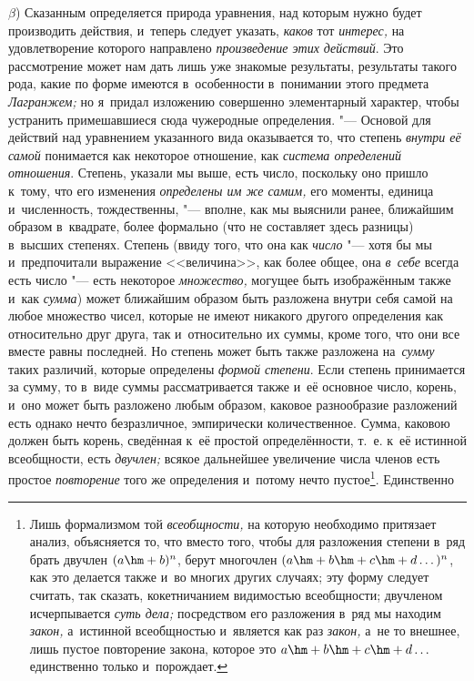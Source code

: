 $\beta$) Сказанным определяется природа уравнения, над которым нужно будет
производить действия, и~теперь следует указать, {\em каков} тот {\em интерес,}
на удовлетворение которого направлено {\em произведение этих действий}. Это
рассмотрение может нам дать лишь уже знакомые результаты, результаты такого
рода, какие по форме имеются в~особенности в~понимании этого предмета
{\em Лагранжем;} но я~придал изложению совершенно элементарный характер, чтобы
устранить примешавшиеся сюда чужеродные определения. "--- Основой для действий
над уравнением указанного вида оказывается то, что степень
{\em внутри её самой} понимается как некоторое отношение, как
{\em система определений отношения}. Степень, указали мы выше, есть число,
поскольку оно пришло к~тому, что его изменения {\em определены им же самим,}
его моменты, единица и~численность, тождественны, "--- вполне, как мы выяснили
ранее, ближайшим образом в~квадрате, более формально (что не составляет здесь
разницы) в~высших степенях. Степень (ввиду того, что она как {\em число} "---
хотя бы мы и~предпочитали выражение <<величина>>, как более общее, она
{\em в~себе} всегда есть число "--- есть некоторое {\em множество,} могущее
быть изображённым также и~как {\em сумма}) может ближайшим образом быть
разложена внутри себя самой на любое множество чисел, которые не имеют никакого
другого определения как относительно друг друга, так и~относительно их суммы,
кроме того, что они все вместе равны последней. Но степень может быть также
разложена на~{\em сумму} таких различий, которые определены
{\em формой степени}. Если степень принимается за сумму, то в~виде суммы
рассматривается также и~её основное число, корень, и~оно может быть разложено
любым образом, каковое разнообразие разложений есть однако нечто безразличное,
эмпирически количественное. Сумма, каковою должен быть корень, сведённая к~её
простой определённости, т.~е. к~её истинной всеобщности, есть {\em двучлен;}
всякое дальнейшее увеличение числа членов есть простое {\em повторение} того же
определения и~потому нечто пустое\footnote{Лишь формализмом той
{\em всеобщности,} на которую необходимо притязает анализ, объясняется то, что
вместо того, чтобы для разложения степени в~ряд брать двучлен $(a\hm+b)^n$,
берут многочлен $(a\hm+b\hm+c\hm+d\dots)^n$, как это делается также и~во многих
других случаях; эту форму следует считать, так сказать, кокетничанием
видимостью всеобщности; двучленом исчерпывается {\em суть дела;} посредством
его разложения в~ряд мы находим {\em закон,} а~истинной всеобщностью и~является
как раз {\em закон,} а~не то внешнее, лишь пустое повторение закона, которое
это $a\hm+b\hm+c\hm+d\dots$ единственно только и~порождает.}. Единственно
